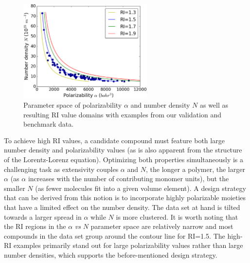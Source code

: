 \begin{figure}[htbp] 
	\centering
	\includegraphics[width=0.6\textwidth]{Chapter-2/Figures/Den_vs_pol_contour.eps}
	\caption{Parameter space of polarizability $\alpha$ and number density $N$ as well as resulting RI value domains with examples from our validation and benchmark data.} 
	\label{fig:relationship} 
\end{figure} 

To achieve high RI values, a candidate compound must feature both large number density and polarizability values (as is also apparent from the structure of the Lorentz-Lorenz equation). Optimizing both properties simultaneously is a challenging task as extensivity couples $\alpha$ and $N$, \ie  the longer a polymer, the larger $\alpha$ (as $\alpha$ increases with the number of contributing monomer units), but the smaller $N$ (as fewer molecules fit into a given volume element). A design strategy that can be derived from this notion is to incorporate highly polarizable moieties that have a limited effect on the number density. The data set at hand is tilted towards a larger spread in $\alpha$ while $N$ is more clustered. It is worth noting that the RI regions in the $\alpha$ \textit{vs} $N$ parameter space are relatively narrow and most compounds in the data set group around the contour line for RI=1.5. The high-RI examples primarily stand out for large polarizability values rather than large number densities, which supports the before-mentioned design strategy.


